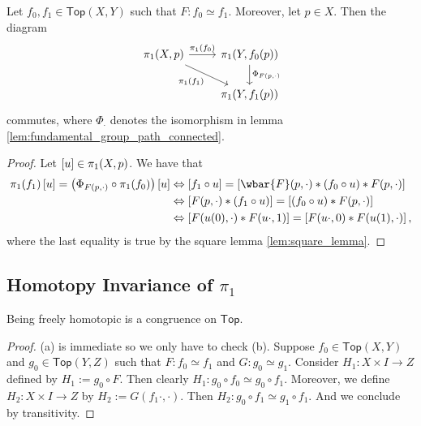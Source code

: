 \begin{proposition}
	\label{prop:free_homotopy_pi_1}
	Let $f_0,f_1 \in \mathsf{Top}(X,Y)$ such that $F : f_0 \simeq f_1$. Moreover, let $p \in X$. Then the diagram
	\begin{equation*}
		\begin{tikzcd}
			\pi_1(X,p) \arrow[r,"\pi_1(f_0)"]\arrow[dr,"\pi_1(f_1)"'] & \pi_1(Y,f_0(p)) \arrow[d,"\Phi_{F(p,\cdot)}"]\\
			& \pi_1(Y,f_1(p))
		\end{tikzcd}
	\end{equation*}
	\noindent commutes, where $\Phi_\cdot$ denotes the isomorphism in lemma \ref{lem:fundamental_group_path_connected}.
\end{proposition}

\begin{proof}
	Let $\sbr{u} \in \pi_1(X,p)$. We have that
	\begin{align*}
		\pi_1(f_1)\sbr{u} = \del[1]{\Phi_{F(p,\cdot)} \circ \pi_1(f_0)}\sbr{u} & \Leftrightarrow \sbr[0]{f_1 \circ u} = \sbr[0]{\wbar{F}(p,\cdot) \ast (f_0 \circ u) \ast F(p,\cdot)}\\
		& \Leftrightarrow \sbr[0]{F(p,\cdot) \ast (f_1 \circ u)} = \sbr[0]{(f_0 \circ u) \ast F(p,\cdot)}\\
		& \Leftrightarrow \sbr[0]{F(u(0),\cdot) \ast F(u\cdot,1)} = \sbr[0]{F(u\cdot,0) \ast F(u(1),\cdot)},
	\end{align*}
	\noindent where the last equality is true by the square lemma \ref{lem:square_lemma}.
\end{proof}

\subsection*{Homotopy Invariance of $\pi_1$}
\begin{lemma}
	Being freely homotopic is a congruence on $\mathsf{Top}$.
	\label{lem:freely_homotopic_congruence}
\end{lemma}

\begin{proof}
	(a) is immediate so we only have to check (b). Suppose $f_0 \in \mathsf{Top}(X,Y)$ and $g_0 \in \mathsf{Top}(Y,Z)$ such that $F : f_0 \simeq f_1$ and $G : g_0 \simeq g_1$. Consider $H_1 : X \times I \to Z$ defined by $H_1 := g_0 \circ F$. Then clearly $H_1 : g_0 \circ f_0 \simeq g_0 \circ f_1$. Moreover, we define $H_2 : X \times I \to Z$ by $H_2 := G(f_1 \cdot,\cdot)$. Then $H_2 : g_0 \circ f_1 \simeq g_1 \circ f_1$. And we conclude by transitivity. 
\end{proof}

